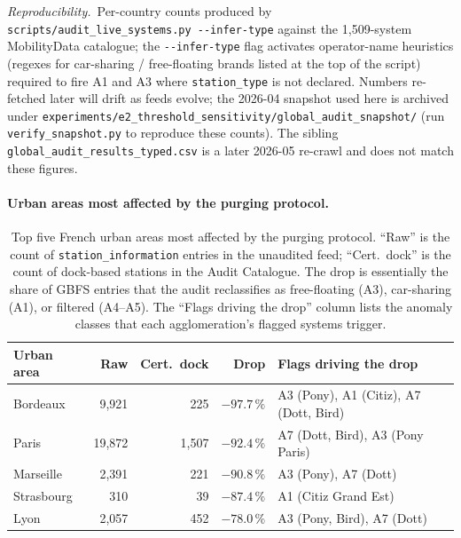 \documentclass[11pt,a4paper]{article}
\begin{document}
\begin{table}[!htbp]
\medskip
{\footnotesize \emph{Reproducibility.}~Per-country counts produced by
\texttt{scripts/audit\_live\_systems.py -{}-infer-type} against the
1{,}509-system MobilityData catalogue; the \texttt{-{}-infer-type}
flag activates operator-name heuristics (regexes for car-sharing /
free-floating brands listed at the top of the script) required to
fire A1 and A3 where \texttt{station\_type} is not declared.
Numbers re-fetched later will drift as feeds evolve; the 2026-04 snapshot
used here is archived under
\texttt{experiments/e2\_threshold\_sensitivity/global\_audit\_snapshot/}
(run \texttt{verify\_snapshot.py} to reproduce these counts). The sibling
\texttt{global\_audit\_results\_typed.csv} is a later 2026-05 re-crawl and
does not match these figures.}
\end{table}

\paragraph{Urban areas most affected by the purging protocol.}

\begin{table}[!htbp]
\centering
\caption{Top five French urban areas most affected by the purging
protocol. ``Raw'' is the count of \texttt{station\_information}
entries in the unaudited feed; ``Cert.\ dock'' is the count of
dock-based stations in the Audit Catalogue. The drop is essentially
the share of GBFS entries that the audit reclassifies as
free-floating (A3), car-sharing (A1), or filtered (A4--A5). The
``Flags driving the drop'' column lists the anomaly classes that
each agglomeration's flagged systems trigger.}
\label{tab:top5-reranks}
\small
\begin{tabular}{@{}lrrrl@{}}
\toprule
\textbf{Urban area} & \textbf{Raw} & \textbf{Cert.\ dock}
                    & \textbf{Drop} & \textbf{Flags driving the drop}\\
\midrule
Bordeaux         & 9{,}921 & 225   & $-97.7\,\%$
                 & A3 (Pony), A1 (Citiz), A7 (Dott, Bird) \\
Paris            & 19{,}872 & 1{,}507 & $-92.4\,\%$
                 & A7 (Dott, Bird), A3 (Pony Paris) \\
Marseille        & 2{,}391 & 221   & $-90.8\,\%$
                 & A3 (Pony), A7 (Dott) \\
Strasbourg       & 310     & 39    & $-87.4\,\%$
                 & A1 (Citiz Grand Est) \\
Lyon             & 2{,}057 & 452   & $-78.0\,\%$
                 & A3 (Pony, Bird), A7 (Dott) \\
\bottomrule
\end{tabular}
\end{table}
\end{document}
